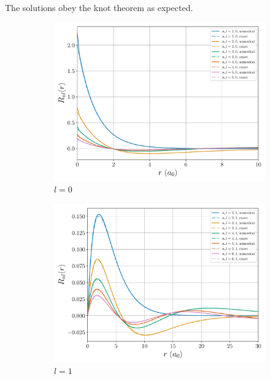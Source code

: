 \documentclass[a4paper,DIV=12,english]{scrartcl}
\begin{document}
The solutions obey the knot theorem as expected.
\begin{figure}
    \centering
    \begin{subfigure}{0.49\textwidth}
        \centering
        \includegraphics[width=\textwidth]{../plots/psis_comp/l0.pdf}
        \caption{$l=0$}
        \label{subfig:l0}
    \end{subfigure}
    \begin{subfigure}{0.49\textwidth}
        \centering
        \includegraphics[width=\textwidth]{../plots/psis_comp/l1.pdf}
        \caption{$l=1$}
        \label{subfig:l1}
    \end{subfigure}
    \begin{subfigure}{0.49\textwidth}

\end{subfigure}
\end{figure}
\end{document}
